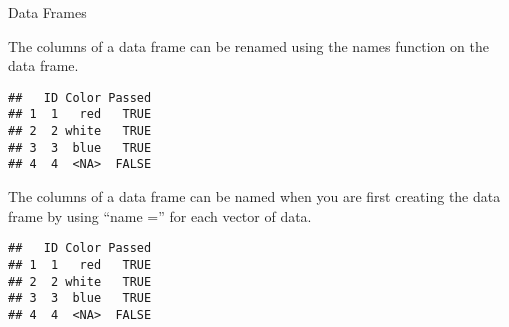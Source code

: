 \begin{frame}[fragile]{Data Frames}
\protect\hypertarget{data-frames-1}{}

The columns of a data frame can be renamed using the names function on
the data frame.

\begin{Shaded}
\begin{Highlighting}[]
    \StringTok{ }\NormalTok{(}\NormalTok{, }\NormalTok{, }\NormalTok{)}
\end{Highlighting}
\end{Shaded}

\begin{verbatim}
##   ID Color Passed
## 1  1   red   TRUE
## 2  2 white   TRUE
## 3  3  blue   TRUE
## 4  4  <NA>  FALSE
\end{verbatim}

The columns of a data frame can be named when you are first creating the
data frame by using ``name ='' for each vector of data.

\begin{Shaded}
\begin{Highlighting}[]
\StringTok{ }\NormalTok{(}
\end{Highlighting}
\end{Shaded}

\begin{verbatim}
##   ID Color Passed
## 1  1   red   TRUE
## 2  2 white   TRUE
## 3  3  blue   TRUE
## 4  4  <NA>  FALSE
\end{verbatim}

\end{frame}

